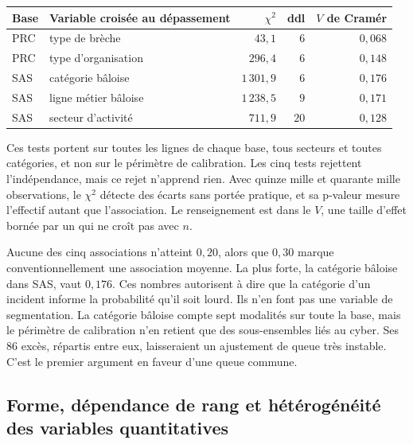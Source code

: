 \begin{center}\small
\renewcommand{\arraystretch}{1.15}
\begin{tabular}{@{}l l r r r@{}}
\toprule
\textbf{Base} & \textbf{Variable croisée au dépassement} & \textbf{$\chi^2$} & \textbf{ddl} &
\textbf{$V$ de Cramér} \\
\midrule
PRC & type de brèche              & $43{,}1$     & $6$  & $0{,}068$ \\
PRC & type d'organisation         & $296{,}4$    & $6$  & $0{,}148$ \\
\midrule
SAS & catégorie bâloise           & $1\,301{,}9$ & $6$  & $0{,}176$ \\
SAS & ligne métier bâloise        & $1\,238{,}5$ & $9$  & $0{,}171$ \\
SAS & secteur d'activité          & $711{,}9$    & $20$ & $0{,}128$ \\
\bottomrule
\end{tabular}
\end{center}

\vspace{2pt}
\noindent Ces tests portent sur toutes les lignes de chaque base, tous secteurs et toutes catégories, et non sur le périmètre de calibration. Les cinq tests rejettent l'indépendance, mais ce rejet n'apprend rien. Avec quinze mille et
quarante mille observations, le $\chi^2$ détecte des écarts sans portée pratique, et sa p-valeur mesure
l'effectif autant que l'association. Le renseignement est dans le $V$, une taille d'effet bornée par un
qui ne croît pas avec $n$.

Aucune des cinq associations n'atteint $0{,}20$, alors que $0{,}30$ marque
conventionnellement une association moyenne. La plus forte, la catégorie bâloise dans SAS, vaut $0{,}176$.
Ces nombres autorisent à dire que la catégorie d'un incident informe la probabilité qu'il soit lourd. Ils
n'en font pas une variable de segmentation. La catégorie bâloise compte sept modalités sur toute la base, mais le périmètre de calibration n'en retient que des sous-ensembles liés au cyber. Ses $86$ excès, répartis entre eux, laisseraient un ajustement de queue très instable. C'est le premier argument en faveur d'une queue commune.

\subsection{Forme, dépendance de rang et hétérogénéité des variables quantitatives}
\label{subsec:tests-quantitatifs}

